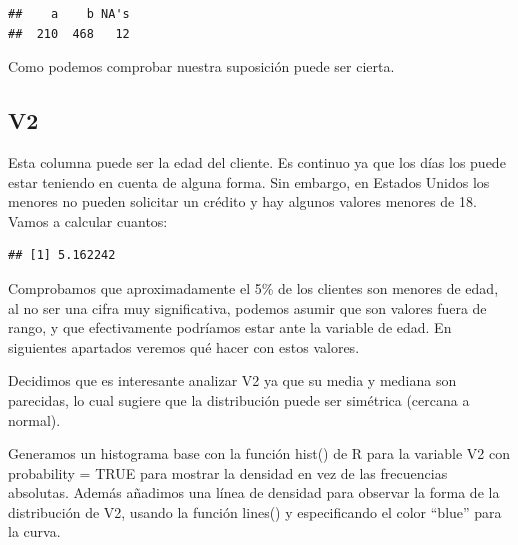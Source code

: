 \documentclass[
]{article}
\newenvironment{Shaded}{\begin{snugshade}}{\end{snugshade}}
\newcommand{\AttributeTok}[1]{\textcolor[rgb]{0.13,0.29,0.53}{#1}}
\newcommand{\ConstantTok}[1]{\textcolor[rgb]{0.56,0.35,0.01}{#1}}
\newcommand{\DecValTok}[1]{\textcolor[rgb]{0.00,0.00,0.81}{#1}}
\newcommand{\FunctionTok}[1]{\textcolor[rgb]{0.13,0.29,0.53}{\textbf{#1}}}
\newcommand{\NormalTok}[1]{#1}
\newcommand{\OtherTok}[1]{\textcolor[rgb]{0.56,0.35,0.01}{#1}}
\newcommand{\SpecialCharTok}[1]{\textcolor[rgb]{0.81,0.36,0.00}{\textbf{#1}}}
\begin{document}
\begin{verbatim}
##    a    b NA's 
##  210  468   12
\end{verbatim}

Como podemos comprobar nuestra suposición puede ser cierta.

\hypertarget{v2}{%
\subsection{V2}\label{v2}}

Esta columna puede ser la edad del cliente. Es continuo ya que los días
los puede estar teniendo en cuenta de alguna forma. Sin embargo, en
Estados Unidos los menores no pueden solicitar un crédito y hay algunos
valores menores de 18. Vamos a calcular cuantos:

\begin{Shaded}
\end{Shaded}

\begin{verbatim}
## [1] 5.162242
\end{verbatim}

Comprobamos que aproximadamente el 5\% de los clientes son menores de
edad, al no ser una cifra muy significativa, podemos asumir que son
valores fuera de rango, y que efectivamente podríamos estar ante la
variable de edad. En siguientes apartados veremos qué hacer con estos
valores.

Decidimos que es interesante analizar V2 ya que su media y mediana son
parecidas, lo cual sugiere que la distribución puede ser simétrica
(cercana a normal).

Generamos un histograma base con la función hist() de R para la variable
V2 con probability = TRUE para mostrar la densidad en vez de las
frecuencias absolutas. Además añadimos una línea de densidad para
observar la forma de la distribución de V2, usando la función lines() y
especificando el color ``blue'' para la curva.
\end{document}
